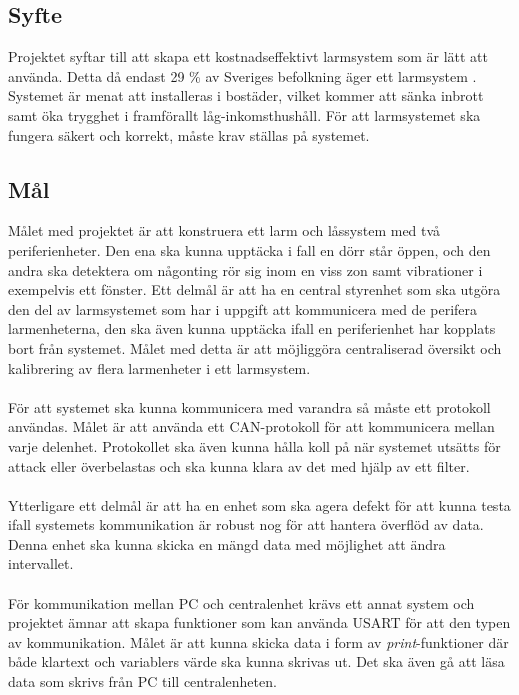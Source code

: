 \documentclass{article}
\begin{document}

\subsection{Syfte}
Projektet syftar till att skapa ett kostnadseffektivt larmsystem som är lätt att använda.
Detta då endast 29 \% av Sveriges befolkning äger ett larmsystem \cite{SSF}.
Systemet är menat att installeras i bostäder, vilket kommer att sänka inbrott samt öka trygghet i framförallt låg-inkomsthushåll.
För att larmsystemet ska fungera säkert och korrekt, måste krav ställas på systemet.

\subsection{Mål}
Målet med projektet är att konstruera ett larm och låssystem med två periferienheter.
Den ena ska kunna upptäcka i fall en dörr står öppen, och den andra ska detektera om någonting rör sig inom en viss zon samt vibrationer i exempelvis ett fönster. 
Ett delmål är att ha en central styrenhet som ska utgöra den del av larmsystemet som har i uppgift att kommunicera med de perifera larmenheterna, den ska även kunna upptäcka ifall en periferienhet har kopplats bort från systemet.
Målet med detta är att möjliggöra centraliserad översikt och kalibrering av flera larmenheter i ett larmsystem.\\
\\
För att systemet ska kunna kommunicera med varandra så måste ett protokoll användas.
Målet är att använda ett CAN-protokoll för att kommunicera mellan varje delenhet. Protokollet ska även kunna hålla koll på när systemet utsätts för attack eller överbelastas och ska kunna klara av det med hjälp av ett filter.\\
\\
Ytterligare ett delmål är att ha en enhet som ska agera defekt för att kunna testa ifall systemets kommunikation är robust nog för att hantera överflöd av data.
Denna enhet ska kunna skicka en mängd data med möjlighet att ändra intervallet.\\
\\
För kommunikation mellan PC och centralenhet krävs ett annat system och projektet ämnar att skapa funktioner som kan använda USART för att den typen av kommunikation.
Målet är att kunna skicka data i form av \emph{print}-funktioner där både klartext och variablers värde ska kunna skrivas ut. Det ska även gå att läsa data som skrivs från PC till centralenheten.\\
\end{document}
